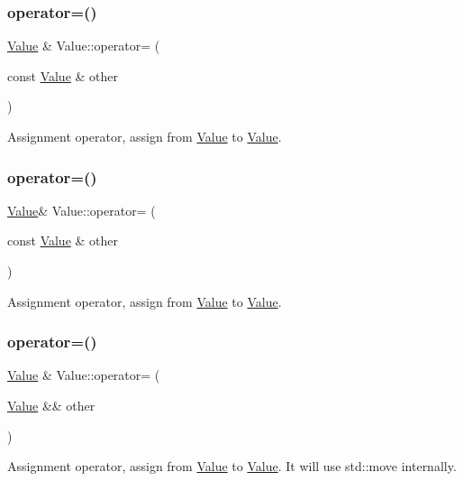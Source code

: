\subsubsection{\texorpdfstring{operator=()}{operator=()}\hspace{0.1cm}{\footnotesize\ttfamily [1/32]}}
{\footnotesize\ttfamily \hyperlink{classValue}{Value} \& Value\+::operator= (\begin{DoxyParamCaption}\item[{const \hyperlink{classValue}{Value} \&}]{other }\end{DoxyParamCaption})}

Assignment operator, assign from \hyperlink{classValue}{Value} to \hyperlink{classValue}{Value}. \mbox{\label{classValue_a72d1acd5e9d5711f776ba325a2f823b1}} 
\subsubsection{\texorpdfstring{operator=()}{operator=()}\hspace{0.1cm}{\footnotesize\ttfamily [2/32]}}
{\footnotesize\ttfamily \hyperlink{classValue}{Value}\& Value\+::operator= (\begin{DoxyParamCaption}\item[{const \hyperlink{classValue}{Value} \&}]{other }\end{DoxyParamCaption})}

Assignment operator, assign from \hyperlink{classValue}{Value} to \hyperlink{classValue}{Value}. \mbox{\label{classValue_ac97efea0f73007b2891dfbe90522eb54}} 
\subsubsection{\texorpdfstring{operator=()}{operator=()}\hspace{0.1cm}{\footnotesize\ttfamily [3/32]}}
{\footnotesize\ttfamily \hyperlink{classValue}{Value} \& Value\+::operator= (\begin{DoxyParamCaption}\item[{\hyperlink{classValue}{Value} \&\&}]{other }\end{DoxyParamCaption})}

Assignment operator, assign from \hyperlink{classValue}{Value} to \hyperlink{classValue}{Value}. It will use std\+::move internally. \mbox{\label{classValue_ae51715910e94924915d8c5441ae69fb0}} 
